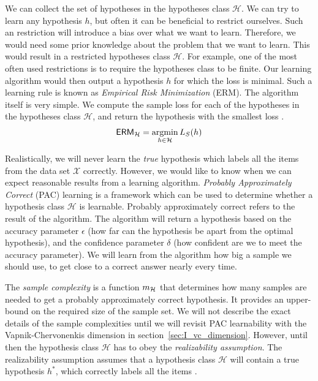 \documentclass[../main.tex]{subfiles}
\begin{document}
We can collect the set of hypotheses in the hypotheses class $\mathcal{H}$.
We can try to learn any hypothesis $h$, but often it can be beneficial to restrict ourselves.
Such an restriction will introduce a bias over what we want to learn.
Therefore, we would need some prior knowledge about the problem that we want to learn.
This would result in a restricted hypotheses class $\mathcal{H}$.
For example, one of the most often used restrictions is to require the hypotheses class to be finite.
Our learning algorithm would then output a hypothesis $h$ for which the loss is minimal.
Such a learning rule is known as \emph{Empirical Risk Minimization} (ERM).
The algorithm itself is very simple.
We compute the sample loss for each of the hypotheses in the hypotheses class $\mathcal{H}$, and return the hypothesis with the smallest loss 
\cite[Chapter~2]{Shalev2014understanding}.
\begin{align}
    \label{eq:erm}
    \mathsf{ERM}_{\mathcal{H}} = \operatorname*{argmin}_{h \in \mathcal{H}} L_S(h)
\end{align}


Realistically, we will never learn the \emph{true} hypothesis which labels all the items from the data set $\mathcal{X}$ correctly.
However, we would like to know when we can expect reasonable results from a learning algorithm.
\emph{Probably Approximately Correct} (PAC) learning is a framework which can be used to determine whether a hypothesis class $\mathcal{H}$ is learnable.
Probably approximately correct refers to the result of the algorithm.
The algorithm will return a hypothesis based on the accuracy parameter $\epsilon$ (how far can the hypothesis be apart from the optimal hypothesis),
and the confidence parameter $\delta$ (how confident are we to meet the accuracy parameter).
We will learn from the algorithm how big a sample we should use, to get close to a correct answer nearly every time.


The \emph{sample complexity} is a function $m_{\mathcal{H}}$ that determines how many samples are needed to get a probably approximately correct hypothesis.
It provides an upper-bound on the required size of the sample set.
We will not describe the exact details of the sample complexities until we will revisit PAC learnability with the Vapnik-Chervonenkis dimension in section~\ref{sec:I_vc_dimension}.
However, until then the hypothesis class $\mathcal{H}$ has to obey the \emph{realizability assumption}.
The realizability assumption assumes that a hypothesis class $\mathcal{H}$ will contain a true hypothesis $h^*$, which correctly labels all the items
\cite[Chapter~3]{Shalev2014understanding}.
\end{document}
